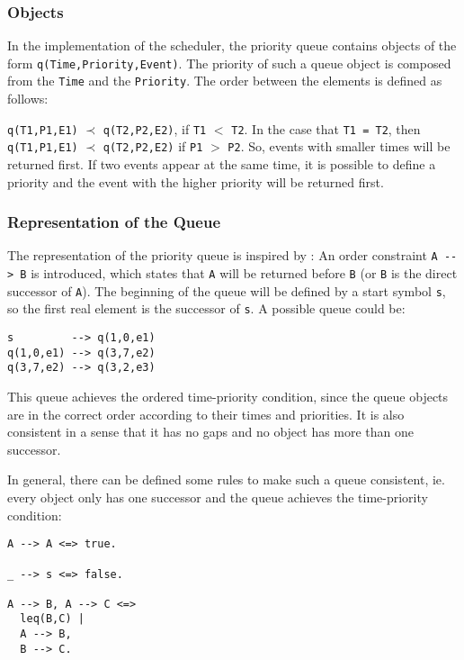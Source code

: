 \subsubsection{Objects}

In the implementation of the scheduler, the priority queue contains objects of the form \verb|q(Time,Priority,Event)|. The priority of such a queue object is composed from the \verb|Time| and the \verb|Priority|. The order between the elements is defined as follows:

\begin{definition}
\verb|q(T1,P1,E1)| $\prec$ \verb|q(T2,P2,E2)|, if \verb|T1| $<$ \verb|T2|. In the case that \verb|T1 = T2|, then \verb|q(T1,P1,E1)| $\prec$ \verb|q(T2,P2,E2)| if \verb|P1| $>$ \verb|P2|. So, events with smaller times will be returned first. If two events appear at the same time, it is possible to define a priority and the event with the higher priority will be returned first. 
\end{definition}

\subsubsection{Representation of the Queue}

The representation of the priority queue is inspired by \cite[38\psqq]{fru_chr_book_2009}: An order constraint \verb|A --> B| is introduced, which states that \verb|A| will be returned before \verb|B| (or \verb|B| is the direct successor of \verb|A|). The beginning of the queue will be defined by a start symbol \verb|s|, so the first real element is the successor of \verb|s|. A possible queue could be:

\begin{lstlisting}
s         --> q(1,0,e1)
q(1,0,e1) --> q(3,7,e2)
q(3,7,e2) --> q(3,2,e3)
\end{lstlisting}

This queue achieves the ordered time-priority condition, since the queue objects are in the correct order according to their times and priorities. It is also consistent in a sense that it has no gaps and no object has more than one successor.

In general, there can be defined some rules to make such a queue consistent, ie. every object only has one successor and the queue achieves the time-priority condition:

\begin{lstlisting}
A --> A <=> true.

_ --> s <=> false.

A --> B, A --> C <=>
  leq(B,C) |
  A --> B,
  B --> C.
\end{lstlisting}

